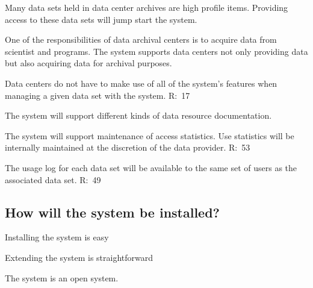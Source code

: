 \begin{list}{}{}
\begin{list}{--}{}
\begin{list}{--}{}
\end{list}

\item Many data sets held in data center archives are high profile items.
       Providing access to these data sets will jump start the system.

\item  One of the responsibilities of data archival centers is to acquire 
       data from scientist and programs.  The system supports data
       centers not only providing data but also acquiring data for
       archival purposes.

\item Data centers do not have to make use of all of the system's
       features when managing a given data set with the system.
       R:~17

\item The system will support different kinds of data resource documentation. 

\begin{list}{--}{}

     \item The system will support maintenance of access statistics.  Use
           statistics will be internally maintained at the discretion of
           the data provider. 
           R:~53

     \item The usage log for each data set will be available to the same set of
           users as the associated data set.
           R:~49

\end{list}

\end{list}

\subsection {How will the system be installed?}

\begin{list}{.}{}

\item Installing the system is easy

\item Extending the system is straightforward

\item The system is an open system.

\end{list}


\end{list}
